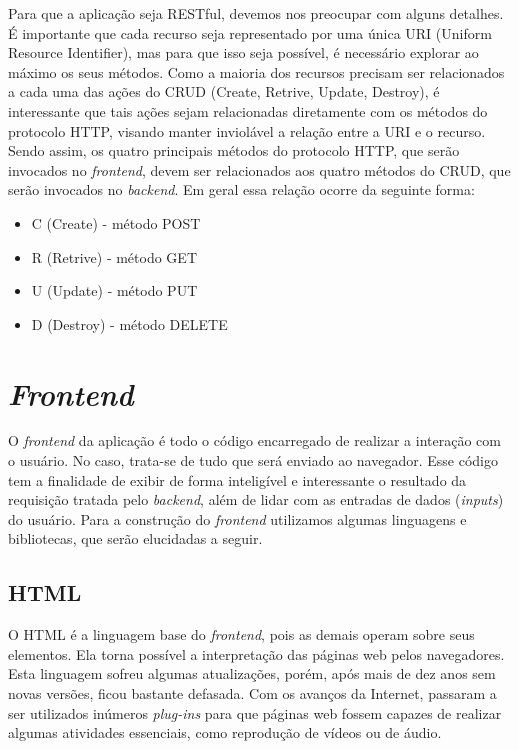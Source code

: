 Para que a aplicação seja RESTful, devemos nos preocupar com alguns detalhes. É importante que cada recurso seja representado por uma única URI (Uniform Resource Identifier),
mas para que isso seja possível, é necessário explorar ao máximo os seus métodos. Como a maioria dos recursos precisam ser relacionados a cada uma das ações do CRUD (Create, Retrive, Update, Destroy),
é interessante que tais ações sejam relacionadas diretamente com os métodos do protocolo HTTP, visando manter inviolável a relação entre a URI e o recurso. Sendo assim, os quatro principais métodos do protocolo HTTP, que serão invocados no \textit{frontend}, devem ser relacionados aos quatro métodos do CRUD, que serão invocados no \textit{backend}. Em geral essa relação ocorre da seguinte forma:
\begin{itemize}
\item C (Create) - método POST
\item R (Retrive) - método GET
\item U (Update) - método PUT
\item D (Destroy) - método DELETE
\end{itemize}

\section{\textit{Frontend}}

O \textit{frontend} da aplicação é todo o código encarregado de realizar a interação com o usuário. No caso, trata-se de tudo que será enviado ao navegador. Esse código tem a finalidade de exibir de forma inteligível e interessante o resultado da requisição tratada pelo \textit{backend}, além de lidar com as entradas de dados (\textit{inputs}) do usuário. Para a construção do \textit{frontend} utilizamos algumas linguagens e bibliotecas, que serão elucidadas a seguir.

\subsection{HTML}

O HTML é a linguagem base do \textit{frontend}, pois as demais operam sobre seus elementos. Ela torna possível a interpretação das páginas web pelos navegadores. Esta linguagem sofreu algumas atualizações, porém, após mais de dez anos sem novas versões, ficou bastante defasada. Com os avanços da Internet, passaram a ser utilizados inúmeros \textit{plug-ins} para que páginas web fossem capazes de realizar algumas atividades essenciais, como reprodução de vídeos ou de áudio.


